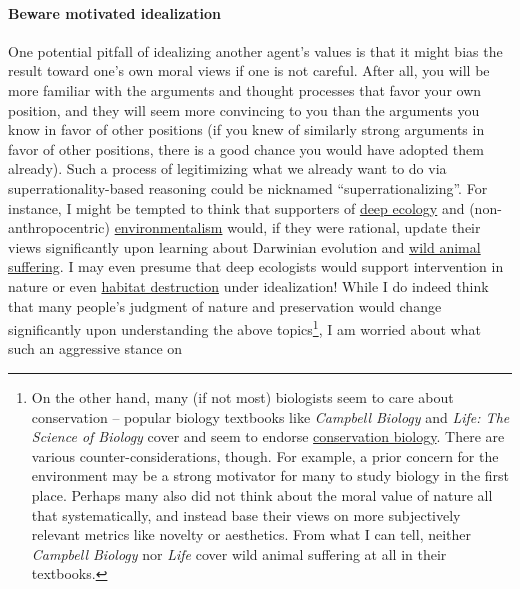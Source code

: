 \paragraph{Beware motivated
idealization}\label{beware-motivated-idealization}

One potential pitfall of idealizing another agent's values is that it
might bias the result toward one's own moral views if one is not
careful. After all, you will be more familiar with the arguments and
thought processes that favor your own position, and they will seem more
convincing to you than the arguments you know in favor of other
positions (if you knew of similarly strong arguments in favor of other
positions, there is a good chance you would have adopted them already).
Such a process of legitimizing what we already want to do via
superrationality-based reasoning could be nicknamed
``superrationalizing''. For instance, I might be tempted to think that
supporters of
\href{https://en.wikipedia.org/wiki/Deep_ecology}{deep ecology}
and (non-anthropocentric)
\href{https://en.wikipedia.org/wiki/Environmentalism}{environmentalism}
would, if they were rational, update their views significantly upon
learning about Darwinian evolution and
\href{https://foundational-research.org/the-importance-of-wild-animal-suffering/}{wild
animal suffering}. I may even presume that deep ecologists would
support intervention in nature or even
\href{http://reducing-suffering.org/habitat-destruction-not-preservation-generally-reduces-wild-animal-suffering/}{habitat
destruction} under idealization! While I do indeed think that many
people's judgment of nature and preservation would change significantly
upon understanding the above topics\footnote{On the other hand, many (if
  not most) biologists seem to care about conservation -- popular
  biology textbooks like \emph{Campbell Biology} \parencite{Urry2016-ey}
  and \emph{Life: The Science of Biology} \parencite{Sadava2012-er}
  cover and seem to endorse
  \href{https://en.wikipedia.org/wiki/Conservation_biology}{conservation
  biology}. There are various counter-considerations, though. For
  example, a prior concern for the environment may be a strong motivator
  for many to study biology in the first place. Perhaps many also did
  not think about the moral value of nature all that systematically, and
  instead base their views on more subjectively relevant metrics like
  novelty or aesthetics. From what I can tell, neither \emph{Campbell
  Biology} nor \emph{Life} cover wild animal suffering at all in their
  textbooks.}, I am worried about what such an aggressive stance on
